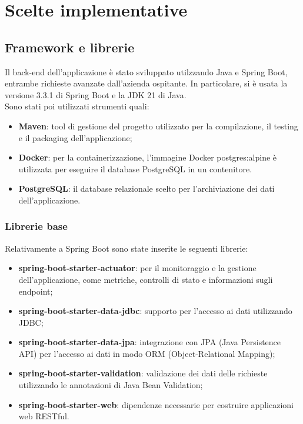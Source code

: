 \newpage
\section{Scelte implementative}

\subsection{Framework e librerie}
Il back-end dell'applicazione è stato sviluppato utilzzando Java e Spring Boot, entrambe richieste avanzate dall'azienda ospitante.
In particolare, si è usata la versione 3.3.1 di Spring Boot e la JDK 21 di Java. \\
Sono stati poi utilizzati strumenti quali:
\begin{itemize}
    \item \textbf{Maven}: tool di gestione del progetto utilizzato per la compilazione, il testing e il packaging dell'applicazione;
    \item \textbf{Docker}: per la containerizzazione, l'immagine Docker postgres:alpine è utilizzata per eseguire il database PostgreSQL in un contenitore.
    \item \textbf{PostgreSQL}: il database relazionale scelto per l'archiviazione dei dati dell'applicazione.
\end{itemize}

\subsubsection*{Librerie base}
Relativamente a Spring Boot sono state inserite le seguenti librerie:
\begin{itemize}
    \item \textbf{spring-boot-starter-actuator}: per il monitoraggio e la gestione dell'applicazione, come metriche, controlli di stato e informazioni sugli endpoint;
    \item \textbf{spring-boot-starter-data-jdbc}: supporto per l'accesso ai dati utilizzando JDBC;
    \item \textbf{spring-boot-starter-data-jpa}: integrazione con JPA (Java Persistence API) per l'accesso ai dati in modo ORM (Object-Relational Mapping);
    \item \textbf{spring-boot-starter-validation}: validazione dei dati delle richieste utilizzando le annotazioni di Java Bean Validation;
    \item \textbf{spring-boot-starter-web}: dipendenze necessarie per costruire applicazioni web RESTful.
\end{itemize}

